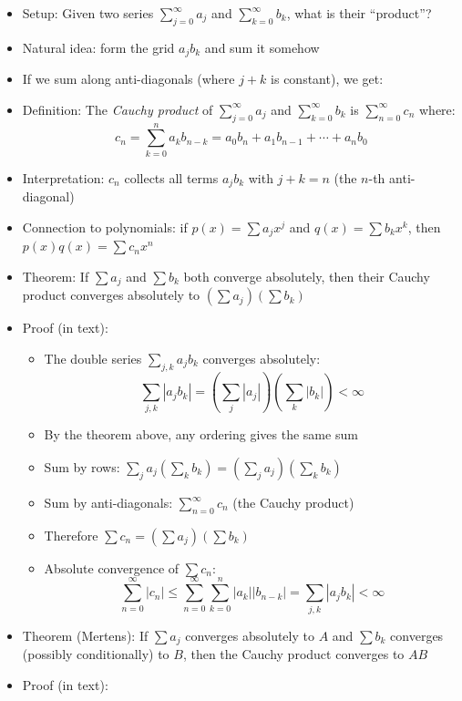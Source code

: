 \documentclass[
  10pt,
  letterpaper,
]{scrbook}
\providecommand{\tightlist}{%
  \setlength{\itemsep}{0pt}\setlength{\parskip}{0pt}}
\begin{document}
\begin{itemize}
\tightlist
\item
  Setup: Given two series \(\sum_{j=0}^{\infty} a_j\) and
  \(\sum_{k=0}^{\infty} b_k\), what is their ``product''?
\item
  Natural idea: form the grid \(a_j b_k\) and sum it somehow
\item
  If we sum along anti-diagonals (where \(j + k\) is constant), we get:
\item
  Definition: The \emph{Cauchy product} of \(\sum_{j=0}^{\infty} a_j\)
  and \(\sum_{k=0}^{\infty} b_k\) is \(\sum_{n=0}^{\infty} c_n\) where:
  \[c_n = \sum_{k=0}^{n} a_k b_{n-k} = a_0 b_n + a_1 b_{n-1} + \cdots + a_n b_0\]
\item
  Interpretation: \(c_n\) collects all terms \(a_j b_k\) with
  \(j + k = n\) (the \(n\)-th anti-diagonal)
\item
  Connection to polynomials: if \(p(x) = \sum a_j x^j\) and
  \(q(x) = \sum b_k x^k\), then \(p(x)q(x) = \sum c_n x^n\)
\item
  Theorem: If \(\sum a_j\) and \(\sum b_k\) both converge absolutely,
  then their Cauchy product converges absolutely to
  \((\sum a_j)(\sum b_k)\)
\item
  Proof (in text):

  \begin{itemize}
  \tightlist
  \item
    The double series \(\sum_{j,k} a_j b_k\) converges absolutely:
    \[\sum_{j,k} |a_j b_k| = \left(\sum_j |a_j|\right)\left(\sum_k |b_k|\right) < \infty\]
  \item
    By the theorem above, any ordering gives the same sum
  \item
    Sum by rows:
    \(\sum_j a_j \left(\sum_k b_k\right) = \left(\sum_j a_j\right)\left(\sum_k b_k\right)\)
  \item
    Sum by anti-diagonals: \(\sum_{n=0}^{\infty} c_n\) (the Cauchy
    product)
  \item
    Therefore \(\sum c_n = (\sum a_j)(\sum b_k)\)
  \item
    Absolute convergence of \(\sum c_n\):
    \[\sum_{n=0}^{\infty} |c_n| \leq \sum_{n=0}^{\infty} \sum_{k=0}^{n} |a_k||b_{n-k}| = \sum_{j,k} |a_j b_k| < \infty\]
  \end{itemize}
\item
  Theorem (Mertens): If \(\sum a_j\) converges absolutely to \(A\) and
  \(\sum b_k\) converges (possibly conditionally) to \(B\), then the
  Cauchy product converges to \(AB\)
\item
  Proof (in text):


\end{itemize}
\end{document}

